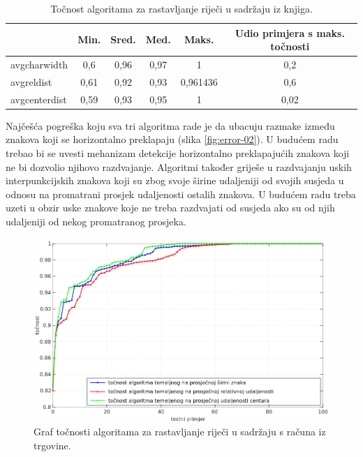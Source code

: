 \documentclass[times, utf8, zavrsni]{fer}
\begin{document}
\begin{table}[htb]
\caption{Točnost algoritama za rastavljanje riječi u sadržaju iz knjiga.}
\label{tbl:result-03}
\centering
\begin{tabular}{lccccc} \hline
& Min. & Sred. & Med. & Maks. & Udio primjera s maks. točnosti \\ \hline
avgcharwidth & 0,6 & 0,96 & 0,97 & 1 & 0,2 \\
avgreldist & 0,61 & 0,92 & 0,93 & 0,961436 & 0,6 \\
avgcenterdist & 0,59 & 0,93 & 0,95 & 1 & 0,02 \\ \hline
\end{tabular}
\end{table}

Najčešća pogreška koju sva tri algoritma rade je da ubacuju razmake između
znakova koji se horizontalno preklapaju (slika \ref{fig:error-02}). U budućem
radu trebao bi se uvesti mehanizam detekcije horizontalno preklapajućih znakova
koji ne bi dozvolio njihovo razdvajanje. Algoritmi također griješe u
razdvajanju uskih interpunkcijskih znakova koji su zbog svoje širine udaljeniji
od svojih susjeda u odnosu na promatrani prosjek udaljenosti ostalih znakova. U
budućem radu treba uzeti u obzir uske znakove koje ne treba razdvajati od
susjeda ako su od njih udaljeniji od nekog promatranog prosjeka.

\begin{figure}[htb]
    \centering
    \captionsetup{justification=centering,margin=2cm}
    \includegraphics[width=\textwidth]{images/result-03.png}
    \caption{
        Graf točnosti algoritama za rastavljanje riječi u sadržaju s računa iz trgovine.
    }
    \label{fig:result-03}
\end{figure}
\end{document}
